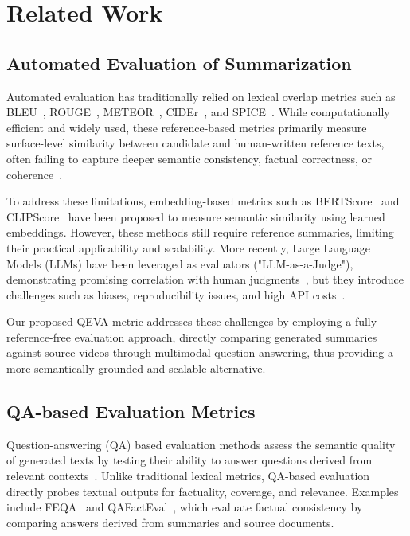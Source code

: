 \section{Related Work}

\subsection{Automated Evaluation of Summarization}

Automated evaluation has traditionally relied on lexical overlap metrics such as BLEU~\cite{papineni2002bleu}, ROUGE~\cite{lin2004rouge}, METEOR~\cite{banerjee2005meteor}, CIDEr~\cite{vedantam2015cider}, and SPICE~\cite{anderson2016spice}. While computationally efficient and widely used, these reference-based metrics primarily measure surface-level similarity between candidate and human-written reference texts, often failing to capture deeper semantic consistency, factual correctness, or coherence~\cite{kryscinski2019evaluating, kasai2022transparenthumanevaluationimage}. 

To address these limitations, embedding-based metrics such as BERTScore~\cite{zhang2020bertscore} and CLIPScore~\cite{hessel2022clipscorereferencefreeevaluationmetric} have been proposed to measure semantic similarity using learned embeddings. However, these methods still require reference summaries, limiting their practical applicability and scalability. More recently, Large Language Models (LLMs) have been leveraged as evaluators ("LLM-as-a-Judge"), demonstrating promising correlation with human judgments~\cite{zheng2023judgingllmasajudgemtbenchchatbot}, but they introduce challenges such as biases, reproducibility issues, and high API costs~\cite{fu2023gptscore}.

Our proposed QEVA metric addresses these challenges by employing a fully reference-free evaluation approach, directly comparing generated summaries against source videos through multimodal question-answering, thus providing a more semantically grounded and scalable alternative.

\subsection{QA-based Evaluation Metrics}

Question-answering (QA) based evaluation methods assess the semantic quality of generated texts by testing their ability to answer questions derived from relevant contexts~\cite{wang2020askingansweringquestionsevaluate}. Unlike traditional lexical metrics, QA-based evaluation directly probes textual outputs for factuality, coverage, and relevance. Examples include FEQA~\cite{Durmus_2020} and QAFactEval~\cite{fabbri2022qafacteval}, which evaluate factual consistency by comparing answers derived from summaries and source documents.

